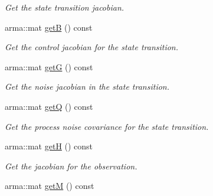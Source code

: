 \begin{DoxyCompactItemize}
\begin{DoxyCompactList}\small\item\em \-Get the state transition jacobian. \end{DoxyCompactList}\item 
\hypertarget{class_linear_system_af1a0b99cb2b4e30eb61b1bee328fb0bd}{arma\-::mat \hyperlink{class_linear_system_af1a0b99cb2b4e30eb61b1bee328fb0bd}{get\-B} () const }\label{class_linear_system_af1a0b99cb2b4e30eb61b1bee328fb0bd}

\begin{DoxyCompactList}\small\item\em \-Get the control jacobian for the state transition. \end{DoxyCompactList}\item 
\hypertarget{class_linear_system_aaadd9d063ecdb4afb67ae4522cf921a7}{arma\-::mat \hyperlink{class_linear_system_aaadd9d063ecdb4afb67ae4522cf921a7}{get\-G} () const }\label{class_linear_system_aaadd9d063ecdb4afb67ae4522cf921a7}

\begin{DoxyCompactList}\small\item\em \-Get the noise jacobian in the state transition. \end{DoxyCompactList}\item 
\hypertarget{class_linear_system_ab95733398800308c2e69522d37f2a005}{arma\-::mat \hyperlink{class_linear_system_ab95733398800308c2e69522d37f2a005}{get\-Q} () const }\label{class_linear_system_ab95733398800308c2e69522d37f2a005}

\begin{DoxyCompactList}\small\item\em \-Get the process noise covariance for the state transition. \end{DoxyCompactList}\item 
\hypertarget{class_linear_system_a678fe164168013e7a4a4fc97e6716fa6}{arma\-::mat \hyperlink{class_linear_system_a678fe164168013e7a4a4fc97e6716fa6}{get\-H} () const }\label{class_linear_system_a678fe164168013e7a4a4fc97e6716fa6}

\begin{DoxyCompactList}\small\item\em \-Get the jacobian for the observation. \end{DoxyCompactList}\item 
\hypertarget{class_linear_system_a4b69f2e4c7b6144c6abb8abf725ce063}{arma\-::mat \hyperlink{class_linear_system_a4b69f2e4c7b6144c6abb8abf725ce063}{get\-M} () const }\label{class_linear_system_a4b69f2e4c7b6144c6abb8abf725ce063}


\end{DoxyCompactItemize}
